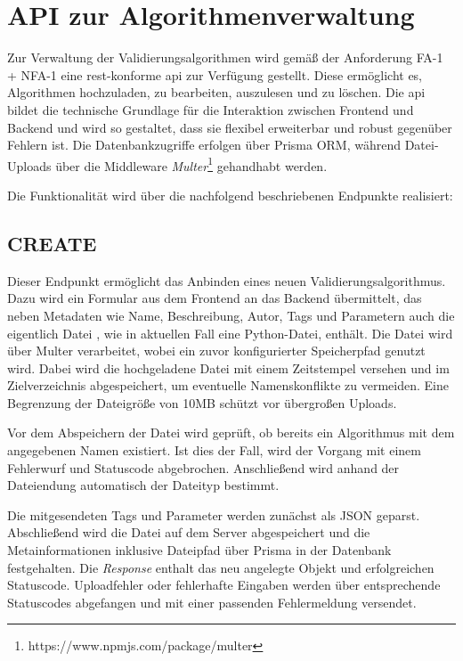 \section{API zur Algorithmenverwaltung}
\label{sec:konzept_api}

Zur Verwaltung der Validierungsalgorithmen wird gemäß der Anforderung FA-1 + NFA-1 eine \gls{rest}-konforme \gls{api} zur Verfügung gestellt. Diese ermöglicht es, Algorithmen hochzuladen, zu bearbeiten, auszulesen und zu löschen. Die \gls{api} bildet die technische Grundlage für die Interaktion zwischen Frontend und Backend und wird so gestaltet, dass sie flexibel erweiterbar und robust gegenüber Fehlern ist. Die Datenbankzugriffe erfolgen über Prisma ORM, während Datei-Uploads über die Middleware \textit{Multer}\footnote{https://www.npmjs.com/package/multer} gehandhabt werden.

Die Funktionalität wird über die nachfolgend beschriebenen Endpunkte realisiert:

\subsection{CREATE}
\label{subsec:api_create}

Dieser Endpunkt ermöglicht das Anbinden eines neuen Validierungsalgorithmus. Dazu wird ein Formular aus dem Frontend an das Backend übermittelt, das neben Metadaten wie Name, Beschreibung, Autor, Tags und Parametern auch die eigentlich Datei , wie in aktuellen Fall eine Python-Datei, enthält. Die Datei wird über Multer verarbeitet, wobei ein zuvor konfigurierter Speicherpfad genutzt wird. Dabei wird die hochgeladene Datei mit einem Zeitstempel versehen und im Zielverzeichnis abgespeichert, um eventuelle Namenskonflikte zu vermeiden. Eine Begrenzung der Dateigröße von 10MB schützt vor übergroßen Uploads.

Vor dem Abspeichern der Datei wird geprüft, ob bereits ein Algorithmus mit dem angegebenen Namen existiert. Ist dies der Fall, wird der Vorgang mit einem Fehlerwurf und Statuscode abgebrochen. Anschließend wird anhand der Dateiendung automatisch der Dateityp bestimmt.

Die mitgesendeten Tags und Parameter werden zunächst als JSON geparst. Abschließend wird die Datei auf dem Server abgespeichert und die Metainformationen inklusive Dateipfad über Prisma in der Datenbank festgehalten. Die \textit{Response} enthalt das neu angelegte Objekt und erfolgreichen Statuscode. Uploadfehler oder fehlerhafte Eingaben werden über entsprechende Statuscodes abgefangen und mit einer passenden Fehlermeldung versendet.

